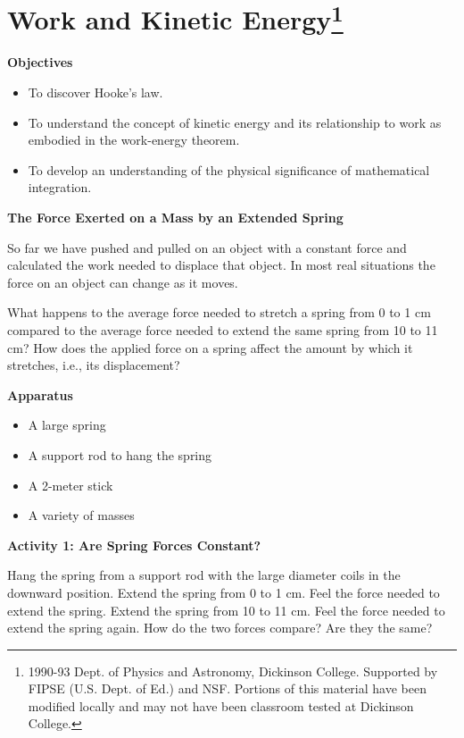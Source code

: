
\section{Work and Kinetic Energy\footnote{
1990-93 Dept. of Physics and Astronomy, Dickinson College. Supported by FIPSE
(U.S. Dept. of Ed.) and NSF. Portions of this material have been modified locally
and may not have been classroom tested at Dickinson College.
}}

\makelabheader %

\textbf{Objectives} 

\begin{itemize}
\item To discover Hooke's law. 
\item To understand the concept of kinetic energy and its relationship to work as
embodied in the work-energy theorem. 
\item To develop an understanding of the physical significance of mathematical integration.
\end{itemize}
\textbf{The Force Exerted on a Mass by an Extended Spring} 

So far we have pushed and pulled on an object with a constant force and calculated
the work needed to displace that object. In most real situations the force on
an object can change as it moves. 

What happens to the average force needed to stretch a spring from 0 to 1 cm
compared to the average force needed to extend the same spring from 10 to 11
cm? How does the applied force on a spring affect the amount by which it stretches,
i.e., its displacement?

\textbf{Apparatus }

\begin{itemize}
\item A large spring 
\item A support rod to hang the spring 
\item A 2-meter stick 
\item A variety of masses
\end{itemize}
\textbf{Activity 1: Are Spring Forces Constant?} 

Hang the spring from a support rod with the large diameter coils in the downward
position. Extend the spring from 0 to 1 cm. Feel the force needed to extend
the spring. Extend the spring from 10 to 11 cm. Feel the force needed to extend
the spring again. How do the two forces compare? Are they the same? 
\vspace{10mm}

